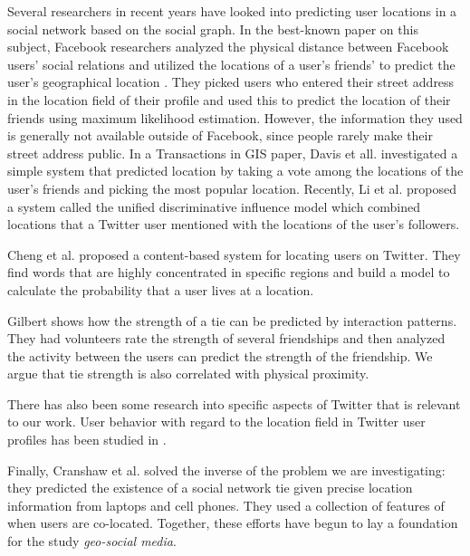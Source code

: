 Several researchers in recent years have looked into predicting user locations
in a social network based on the social graph.
%
In the best-known paper on this subject, Facebook researchers analyzed
the physical distance between Facebook users' social relations and utilized the
locations of a user's friends' to predict the user's geographical location
\cite{backstrom2010find}.
%
They picked users who entered their street address in the location field of
their profile and used this to predict the location of their friends using
maximum likelihood estimation.
%
However, the information they used is generally not available outside of
Facebook, since people rarely make their street address public.
%
In a Transactions in GIS paper, Davis et all. \cite{davis2011infer}
investigated a simple system that predicted location by taking a vote among
the locations of the user's friends and picking the most popular location.
%
Recently, Li et al. proposed a system called the unified discriminative
influence model which combined locations that a Twitter user mentioned with the
locations of the user's followers.

Cheng et al. \cite{cheng2010you} proposed a
content-based system for locating users on Twitter. They find words that are
highly concentrated in specific regions and build a model to calculate the
probability that a user lives at a location.

Gilbert \cite{gilbert2009predicting} shows how the strength of a tie can be
predicted by interaction patterns.  They had volunteers rate the strength of
several friendships and then analyzed the activity between the users can
predict the strength of the friendship.  We argue that tie strength is also
correlated with physical proximity.

There has also been some research into specific aspects of Twitter that is
relevant to our work.  User behavior with regard to the location field in
Twitter user profiles has been studied in \cite{hecht2011tweets}.


Finally, Cranshaw et al. \cite{cranshaw2010bridging} solved the inverse of the
problem we are investigating: they predicted the existence of a social network
tie given precise location information from laptops and cell phones. They used
a collection of features of when users are co-located.  Together, these efforts
have begun to lay a foundation for the study \textit{geo-social media}.

